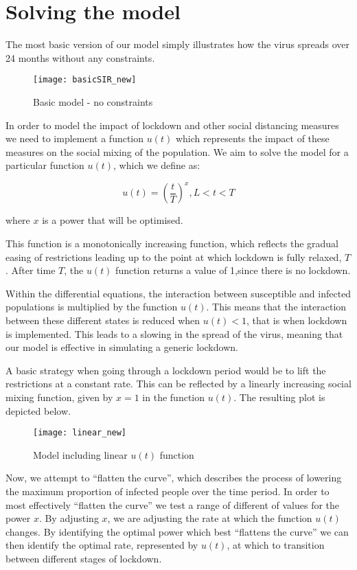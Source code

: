 \documentclass[10pt]{article}
\begin{document}
\section{Solving the model}

The most basic version of our model simply illustrates how the virus spreads over 24 months without any constraints.

\begin{figure}[htbp]
\caption{Basic model - no constraints}
\centerline{\texttt{[image: basicSIR\_new]}}
\end{figure}

\noindent
In order to model the impact of lockdown and other social distancing measures we need to implement a function $u(t)$ which represents the impact of these measures on the social mixing of the population. We aim to solve the model for a particular function $u(t)$, which we define as:

$$u(t)= (\frac {t} {T})^{x} ,  L < t < T$$

where $x$ is a power that will be optimised.

This function is a monotonically increasing function, which reflects the
gradual easing of restrictions leading up to the point at which lockdown is  fully relaxed, $T$. After time $T$, the $u(t)$ function returns a value of 1,since there is no lockdown. \newline

Within the differential equations, the interaction between susceptible and infected populations is multiplied by the function $u(t)$. This means that the  interaction between these different states is reduced when $u(t) < 1$, that is when lockdown is implemented. This leads to a slowing in the spread of the virus, meaning that our model is effective in simulating a generic lockdown. \newline

\noindent 
A basic strategy when going through a lockdown period would be to lift the restrictions at a constant rate. This can be reflected by a linearly increasing social mixing function, given by $x=1$ in the function $u(t)$. The resulting plot is depicted below.

\begin{figure}[htbp]
\caption{Model including linear $u(t)$ function}
\centerline{\texttt{[image: linear\_new]}}
\end{figure}

\noindent
Now, we attempt to ``flatten the curve'', which describes the process of lowering the maximum proportion of infected people over the time period. In order to most effectively ``flatten the curve'' we test a range of different of values for the power $x$. By adjusting $x$, we are adjusting the rate at which the function $u(t)$ changes. By identifying the optimal power which best ``flattens the curve'' we can then identify the optimal rate, represented by $u(t)$, at which to transition between different stages of lockdown. \newline
\end{document}
